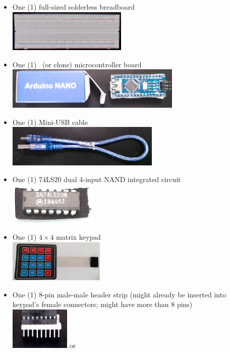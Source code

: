\begin{itemize}
    \item One (1) full-sized solderless breadboard \\
        \includegraphics[height=2cm]{breadboard}
    \item One (1) \nano\ (or clone) microcontroller board \\
        \includegraphics[height=2cm]{nano}
    \item One (1) Mini-USB cable \\
        \includegraphics[height=2cm]{usb}
    \item One (1) 74LS20 dual 4-input NAND integrated circuit \\
        \includegraphics[height=2cm]{nand}
    \item One (1) $4 \times 4$ matrix keypad \\
        \includegraphics[height=2cm]{keypad}
    \item One (1) 8-pin male-male header strip (might already be inserted into
        keypad's female connectors; might have more than 8 pins) \\
        \includegraphics[height=2cm]{header-in-connector} \hspace{1cm} or

\end{itemize}
